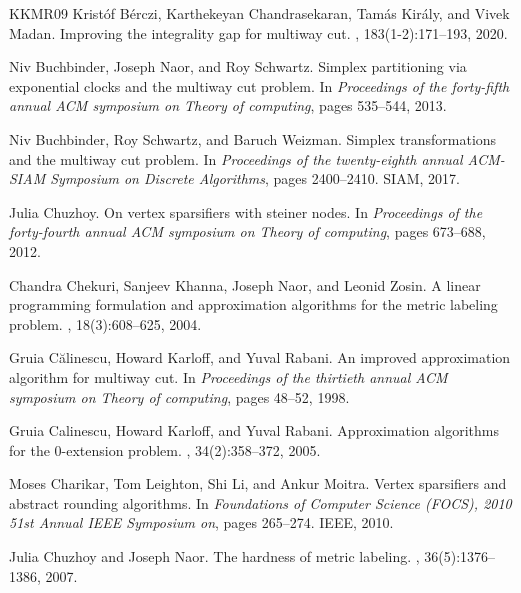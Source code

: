 \documentclass[11pt]{article}
\theoremstyle{definition}
\begin{document}
\begin{titlepage}
\begin{thebibliography}{KKMR09}
Krist{\'o}f B{\'e}rczi, Karthekeyan Chandrasekaran, Tam{\'a}s Kir{\'a}ly, and
  Vivek Madan.
\newblock Improving the integrality gap for multiway cut.
, 183(1-2):171--193, 2020.

Niv Buchbinder, Joseph Naor, and Roy Schwartz.
\newblock Simplex partitioning via exponential clocks and the multiway cut
  problem.
\newblock In {\em Proceedings of the forty-fifth annual ACM symposium on Theory
  of computing}, pages 535--544, 2013.

Niv Buchbinder, Roy Schwartz, and Baruch Weizman.
\newblock Simplex transformations and the multiway cut problem.
\newblock In {\em Proceedings of the twenty-eighth annual ACM-SIAM Symposium on
  Discrete Algorithms}, pages 2400--2410. SIAM, 2017.

Julia Chuzhoy.
\newblock On vertex sparsifiers with steiner nodes.
\newblock In {\em Proceedings of the forty-fourth annual ACM symposium on
  Theory of computing}, pages 673--688, 2012.

Chandra Chekuri, Sanjeev Khanna, Joseph Naor, and Leonid Zosin.
\newblock A linear programming formulation and approximation algorithms for the
  metric labeling problem.
, 18(3):608--625, 2004.

Gruia C{\u{a}}linescu, Howard Karloff, and Yuval Rabani.
\newblock An improved approximation algorithm for multiway cut.
\newblock In {\em Proceedings of the thirtieth annual ACM symposium on Theory
  of computing}, pages 48--52, 1998.

Gruia Calinescu, Howard Karloff, and Yuval Rabani.
\newblock Approximation algorithms for the 0-extension problem.
, 34(2):358--372, 2005.

Moses Charikar, Tom Leighton, Shi Li, and Ankur Moitra.
\newblock Vertex sparsifiers and abstract rounding algorithms.
\newblock In {\em Foundations of Computer Science (FOCS), 2010 51st Annual IEEE
  Symposium on}, pages 265--274. IEEE, 2010.

Julia Chuzhoy and Joseph Naor.
\newblock The hardness of metric labeling.
, 36(5):1376--1386, 2007.


\end{thebibliography}
\end{titlepage}
\end{document}
